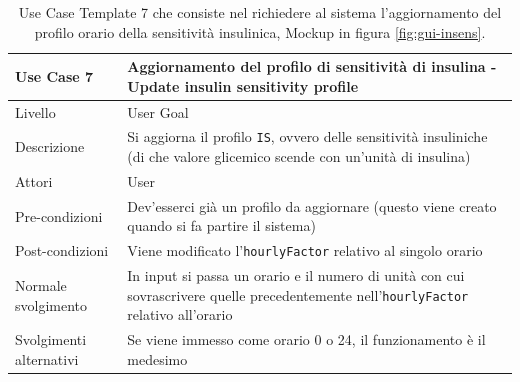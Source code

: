 \documentclass[twocolumn]{article}
\begin{document}
\begin{table}
    \centering
    \captionsetup{justification=centering}
    \begin{tabular}{|p{4.5cm}|p{9.5cm}|}
        \hline
        Use Case 7 & Aggiornamento del profilo di sensitività di insulina - Update insulin sensitivity profile\\
        \hline
        Livello & User Goal \\
        \hline
        Descrizione & Si aggiorna il profilo \texttt{IS}, ovvero delle sensitività insuliniche (di che valore glicemico scende con un'unità di insulina)\\
        \hline
        Attori & User \\
        \hline
        Pre-condizioni & Dev'esserci già un profilo da aggiornare (questo viene creato quando si fa partire il sistema)\\
        \hline
        Post-condizioni & Viene modificato l'\texttt{hourlyFactor} relativo al singolo orario\\
        \hline
        Normale svolgimento & In input si passa un orario e il numero di unità con cui sovrascrivere quelle precedentemente nell'\texttt{hourlyFactor} relativo all'orario\\
        \hline
        Svolgimenti alternativi & Se viene immesso come orario 0 o 24, il funzionamento è il medesimo\\
        \hline
    \end{tabular}
    \caption{Use Case Template 7 che consiste nel richiedere al sistema l'aggiornamento del profilo orario della sensitività insulinica, Mockup in figura \ref{fig:gui-insens}.}
    \label{tab:uc7}
\end{table}
\end{document}
